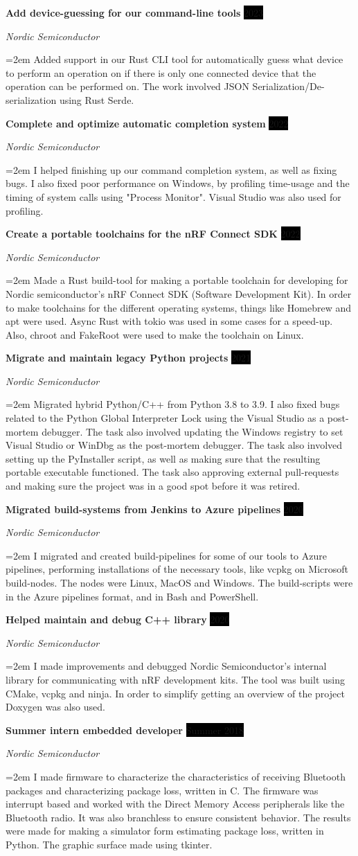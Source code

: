 \documentclass[paper=a4,fontsize=11pt,norsk]{scrartcl} %
\newcommand{\EducationEntry}[4]{
		\noindent \textbf{#1} \hfill      %
		\colorbox{Black}{%
			\parbox{6em}{%
			\hfill\color{White}#2}} \par  %
		\noindent \textit{#3} \par        %
		\noindent\hangindent=2em\hangafter=0 \small #4 %
		\normalsize \par}
\newcommand{\WorkEntry}[4]{				  %
		\noindent \textbf{#1} \hfill      %
		\colorbox{Black}{\color{White}#2} \par  %
		\noindent \textit{#3} \par              %
		\noindent\hangindent=2em\hangafter=0 \small #4 %
		\normalsize \par}
\begin{document}
\WorkEntry{Add device-guessing for our command-line tools}{2023}{Nordic Semiconductor} { Added support in our Rust CLI tool for automatically guess what device to perform an operation on if there is only one connected device that the operation can be performed on. The work involved JSON Serialization/De-serialization using Rust Serde. }
\WorkEntry{Complete and optimize automatic completion system}{2022}{Nordic Semiconductor} { I helped finishing up our command completion system, as well as fixing bugs. I also fixed poor performance on Windows, by profiling time-usage and the timing of system calls using "Process Monitor". Visual Studio was also used for profiling. }
\WorkEntry{Create a portable toolchains for the nRF Connect SDK}{2022}{Nordic Semiconductor} { Made a Rust build-tool for making a portable toolchain for developing for Nordic semiconductor's nRF Connect SDK (Software Development Kit). In order to make toolchains for the different operating systems, things like Homebrew and apt were used. Async Rust with tokio was used in some cases for a speed-up. Also, chroot and FakeRoot were used to make the toolchain on Linux. }
\WorkEntry{Migrate and maintain legacy Python projects}{2021}{Nordic Semiconductor} {Migrated hybrid Python/C++ from Python 3.8 to 3.9. I also fixed bugs related to the Python Global Interpreter Lock using the Visual Studio as a post-mortem debugger. The task also involved updating the Windows registry to set Visual Studio or WinDbg as the post-mortem debugger. The task also involved setting up the PyInstaller script, as well as making sure that the resulting portable executable functioned. The task also approving external pull-requests and making sure the project was in a good spot before it was retired. }
\WorkEntry{Migrated build-systems from Jenkins to Azure pipelines}{2020}{Nordic Semiconductor} {I migrated and created build-pipelines for some of our tools to Azure pipelines, performing installations of the necessary tools, like vcpkg on Microsoft build-nodes. The nodes were Linux, MacOS and Windows. The build-scripts were in the Azure pipelines format, and in Bash and PowerShell. }
\WorkEntry{Helped maintain and debug C++ library}{2020}{Nordic Semiconductor} { I made improvements and debugged Nordic Semiconductor's internal library for communicating with nRF development kits. The tool was built using CMake, vcpkg and ninja. In order to simplify getting an overview of the project Doxygen was also used. }
\WorkEntry{Summer intern embedded developer}{Summer 2018}{Nordic Semiconductor} {I made firmware to characterize the characteristics of receiving Bluetooth packages and characterizing package loss, written in C. The firmware was interrupt based and worked with the Direct Memory Access peripherals like the Bluetooth radio. It was also branchless to ensure consistent behavior. The results were made for making a simulator form estimating package loss, written in Python. The graphic surface made using tkinter. }
\end{document}
